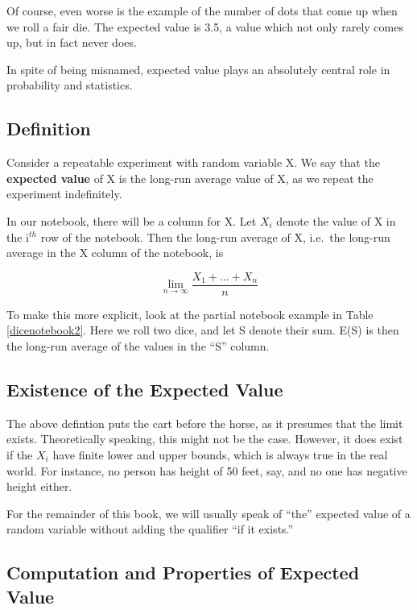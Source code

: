 Of course, even worse is the example of the number of dots that come up
when we roll a fair die.  The expected value is 3.5, a value which not
only rarely comes up, but in fact never does.

In spite of being misnamed, expected value plays an absolutely central
role in probability and statistics.

\subsection{Definition}

Consider a repeatable experiment with random variable X.  We say that
the {\bf expected value} of X is the long-run average value of X, as we
repeat the experiment indefinitely.

In our notebook, there will be a column for X.  Let $X_i$ denote the
value of X in the i$^{th}$ row of the notebook.  Then the long-run
average of X, i.e.\ the long-run average in the X column of the
notebook, is 

\begin{equation}
\label{longrunavg}
\lim_{n \rightarrow \infty} \frac{X_1+...+X_n}{n}
\end{equation}

To make this more explicit, look at the partial notebook example in
Table \ref{dicenotebook2}.  Here we roll two dice, and let S denote
their sum.  E(S) is then the long-run average of the values in the ``S''
column.

\subsection{Existence of the Expected Value}

The above defintion puts the cart before the horse, as it presumes that
the limit exists.  Theoretically speaking, this might not be the case.
However, it does exist if the $X_i$ have finite lower and upper bounds,
which is always true in the real world.  For instance, no person has
height of 50 feet, say, and no one has negative height either.

For the remainder of this book, we will usually speak of ``the''
expected value of a random variable without adding the qualifier ``if it
exists.''

\subsection{Computation and Properties of Expected Value}


